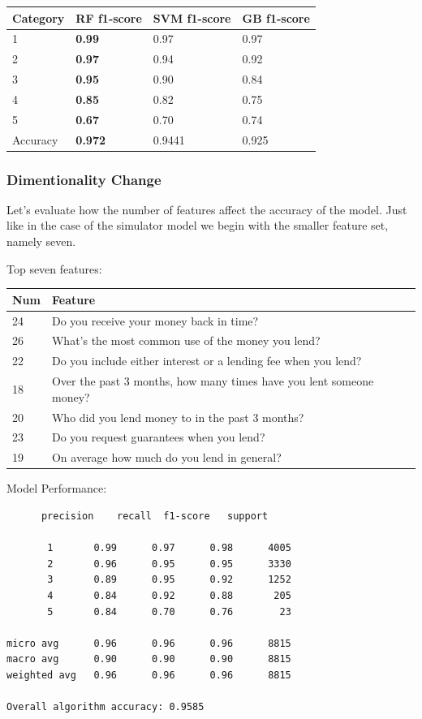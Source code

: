 \begin{longtable}[]{@{}llll@{}}
\toprule
Category & \textbf{RF f1-score} & SVM f1-score & GB
f1-score\tabularnewline
\midrule
\endhead
1 & \textbf{0.99} & 0.97 & 0.97\tabularnewline
2 & \textbf{0.97} & 0.94 & 0.92\tabularnewline
3 & \textbf{0.95} & 0.90 & 0.84\tabularnewline
4 & \textbf{0.85} & 0.82 & 0.75\tabularnewline
5 & \textbf{0.67} & 0.70 & 0.74\tabularnewline
Accuracy & \textbf{0.972} & 0.9441 & 0.925\tabularnewline
\bottomrule
\end{longtable}

\hypertarget{dimentionality-change-1}{%
\subsubsection{Dimentionality Change}\label{dimentionality-change-1}}

Let's evaluate how the number of features affect the accuracy of the
model. Just like in the case of the simulator model we begin with the
smaller feature set, namely seven.

Top seven features:

\begin{longtable}[]{@{}ll@{}}
\toprule
Num & Feature\tabularnewline
\midrule
\endhead
24 & Do you receive your money back in time?\tabularnewline
26 & What's the most common use of the money you lend?\tabularnewline
22 & Do you include either interest or a lending fee when you
lend?\tabularnewline
18 & Over the past 3 months, how many times have you lent someone
money?\tabularnewline
20 & Who did you lend money to in the past 3 months?\tabularnewline
23 & Do you request guarantees when you lend?\tabularnewline
19 & On average how much do you lend in general?\tabularnewline
\bottomrule
\end{longtable}

Model Performance:

\begin{verbatim}
      precision    recall  f1-score   support

       1       0.99      0.97      0.98      4005
       2       0.96      0.95      0.95      3330
       3       0.89      0.95      0.92      1252
       4       0.84      0.92      0.88       205
       5       0.84      0.70      0.76        23

micro avg      0.96      0.96      0.96      8815
macro avg      0.90      0.90      0.90      8815
weighted avg   0.96      0.96      0.96      8815 

Overall algorithm accuracy: 0.9585    
\end{verbatim}

